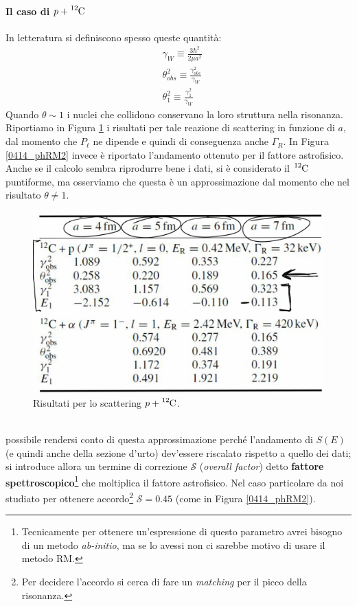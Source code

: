 \paragraph{Il caso di $p + \ce{^{12}C}$}
In letteratura si definiscono spesso queste quantità:
\begin{align*}
	&\gamma_W \equiv \frac{3\hbar^2}{2\mu a^2} \\
	&\theta_{obs}^2 \equiv \frac{\gamma^2_{obs}}{\gamma_W} \\
	&\theta_{1}^2 \equiv \frac{\gamma^2_{1}}{\gamma_W}
\end{align*}
Quando $\theta\sim 1$ i nuclei che collidono conservano la loro struttura nella risonanza.
Riportiamo in Figura \ref{0414_phRM1} i risultati per tale reazione di scattering in funzione di $a$, dal momento che $P_\ell$ ne dipende e quindi di conseguenza anche $\Gamma_R$. In Figura \ref{0414_phRM2} invece è riportato l'andamento ottenuto per il fattore astrofisico. Anche se il calcolo sembra riprodurre bene i dati, si è considerato il $\ce{^{12}C}$ puntiforme, ma osserviamo che questa è un approssimazione dal momento che nel risultato $\theta\not = 1$.
\begin{figure}[h]
	\centering
	\includegraphics[scale=0.3]{Immagini/0414_RM.png}
	\caption{Risultati per lo scattering $p + \ce{^{12}C}$.}
	\label{0414_phRM1}
\end{figure}
\\
\noindent {} possibile rendersi conto di questa approssimazione perché l'andamento di $S(E)$ (e quindi anche della sezione d'urto) dev'essere riscalato rispetto a quello dei dati; si introduce allora un termine di correzione $\mathcal{S}$ (\textit{overall factor}) detto \textbf{fattore spettroscopico}\footnote{Tecnicamente per ottenere un'espressione di questo parametro avrei bisogno di un metodo \textit{ab-initio}, ma se lo avessi non ci sarebbe motivo di usare il metodo RM.} che moltiplica il fattore astrofisico. Nel caso particolare da noi studiato per ottenere accordo\footnote{Per decidere l'accordo si cerca di fare un \textit{matching} per il picco della risonanza.} $\mathcal{S} = 0.45$ (come in Figura \ref{0414_phRM2}).
